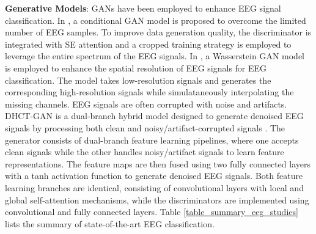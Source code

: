 \documentclass[preprint,12pt]{elsarticle}
\begin{document}
\textbf{Generative Models}: GANs have been employed to enhance EEG signal classification. In \citep{song_eeggan-net_2024}, a conditional GAN model is proposed  to overcome the limited number of EEG samples. To improve data generation quality, the discriminator is integrated with SE attention and a cropped training strategy is employed to leverage the entire spectrum of the EEG signals. In \citep{corley_deep_2025}, a Wasserstein GAN model is employed to enhance the spatial resolution of EEG signals for EEG classification. The model takes low-resolution signals and generates the corresponding high-resolution signals while simulataneously interpolating the missing channels. EEG signals are often corrupted with noise and artifacts. DHCT-GAN is a dual-branch hybrid model designed to generate denoised EEG signals by processing both clean and noisy/artifact-corrupted signals \citep{cai_dhct-gan_2025}. The generator consists of dual-branch feature learning pipelines, where one accepts clean signals while the other handles noisy/artifact signals to learn feature representations. The feature maps are then fused using two fully connected layers with a tanh activation function to generate denoised EEG signals. Both feature learning branches are identical, consisting of convolutional layers with local and global self-attention mechanisms, while the discriminators are implemented using convolutional and fully connected layers. Table \ref{table_summary_eeg_studies} lists the summary of state-of-the-art EEG classification.
\end{document}
